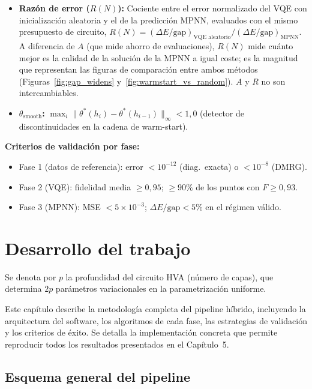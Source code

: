 \documentclass[11pt,a4paper,spanish]{book}
\begin{document}
\begin{itemize}
    \item \textbf{Razón de error ($R(N)$):} Cociente entre el error normalizado del VQE con inicialización aleatoria y el de la predicción MPNN, evaluados con el mismo presupuesto de circuito, $R(N) = (\Delta E/\text{gap})_{\text{VQE aleatorio}} / (\Delta E/\text{gap})_{\text{MPNN}}$. A diferencia de $A$ (que mide ahorro de evaluaciones), $R(N)$ mide cuánto mejor es la calidad de la solución de la MPNN a igual coste; es la magnitud que representan las figuras de comparación entre ambos métodos (Figuras~\ref{fig:gap_widens} y~\ref{fig:warmstart_vs_random}). $A$ y $R$ no son intercambiables.
    \item \textbf{$\theta_{\text{smooth}}$:} $\max_i \|\theta^*(h_i) - \theta^*(h_{i-1})\|_\infty < 1,0$ (detector de discontinuidades en la cadena de warm-start).
\end{itemize}

\label{itm:criterios_fase}
\textbf{Criterios de validación por fase:}
\begin{itemize}
    \item Fase 1 (datos de referencia): error $< 10^{-12}$ (diag.\ exacta) o $< 10^{-8}$ (DMRG).
    \item Fase 2 (VQE): fidelidad media $\geq 0,95$; $\geq 90\%$ de los puntos con $F \geq 0,93$.
    \item Fase 3 (MPNN): MSE $< 5 \times 10^{-3}$; $\Delta E/\text{gap} < 5\%$ en el régimen válido.
\end{itemize}



\chapter{Desarrollo del trabajo}

Se denota por $p$ la profundidad del circuito HVA (número de capas), que determina $2p$ parámetros variacionales en la parametrización uniforme.

Este capítulo describe la metodología completa del pipeline híbrido, incluyendo la arquitectura del software, los algoritmos de cada fase, las estrategias de validación y los criterios de éxito. Se detalla la implementación concreta que permite reproducir todos los resultados presentados en el Capítulo~5.

\section{Esquema general del pipeline}
\end{document}
